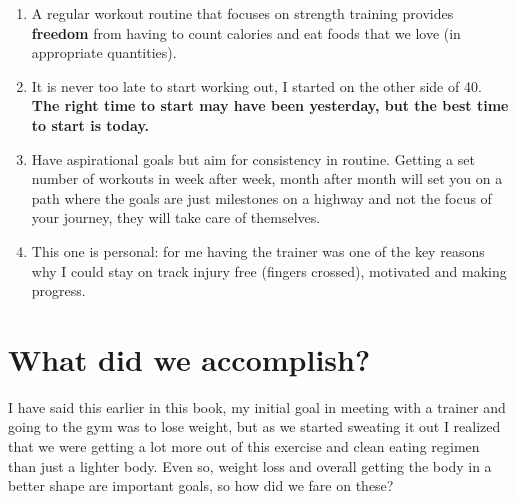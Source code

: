 \documentclass[
  oneside]{book}
\begin{document}
\begin{enumerate}
\def\labelenumi{\arabic{enumi}.}
\item
  A regular workout routine that focuses on strength training provides \textbf{freedom} from having to count calories and eat foods that we love (in appropriate quantities).
\item
  It is never too late to start working out, I started on the other side of 40. \textbf{The right time to start may have been yesterday, but the best time to start is today.}
\item
  Have aspirational goals but aim for consistency in routine. Getting a set number of workouts in week after week, month after month will set you on a path where the goals are just milestones on a highway and not the focus of your journey, they will take care of themselves.
\item
  This one is personal: for me having the trainer was one of the key reasons why I could stay on track injury free (fingers crossed), motivated and making progress.
\end{enumerate}

\hypertarget{what-did-we-accomplish}{%
\chapter{What did we accomplish?}\label{what-did-we-accomplish}}

I have said this earlier in this book, my initial goal in meeting with a trainer and going to the gym was to lose weight, but as we started sweating it out I realized that we were getting a lot more out of this exercise and clean eating regimen than just a lighter body. Even so, weight loss and overall getting the body in a better shape are important goals, so how did we fare on these?
\end{document}

